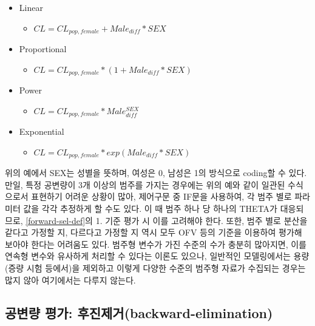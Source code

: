 \documentclass[
  11pt,
  krantz2, a4paper, twoside]{krantz}
\providecommand{\tightlist}{%
  \setlength{\itemsep}{0pt}\setlength{\parskip}{0pt}}
\theoremstyle{definition}
\theoremstyle{definition}
\theoremstyle{definition}
\theoremstyle{remark}
\begin{document}
\begin{itemize}
\tightlist
\item
  Linear

  \begin{itemize}
  \tightlist
  \item
    \(CL = CL_{pop,female} + Male_{diff}*SEX\)
  \end{itemize}
\item
  Proportional

  \begin{itemize}
  \tightlist
  \item
    \(CL = CL_{pop,female} * (1 + Male_{diff}*SEX)\)
  \end{itemize}
\item
  Power

  \begin{itemize}
  \tightlist
  \item
    \(CL = CL_{pop,female} * Male_{diff}^{SEX}\)
  \end{itemize}
\item
  Exponential

  \begin{itemize}
  \tightlist
  \item
    \(CL = CL_{pop,female} * exp(Male_{diff}*SEX)\)
  \end{itemize}
\end{itemize}

위의 예에서 SEX는 성별을 뜻하며, 여성은 0, 남성은 1의 방식으로 coding할 수 있다. 만일, 특정 공변량이 3개 이상의 범주를 가지는 경우에는 위의 예와 같이 일관된 수식으로서 표현하기 어려운 상황이 많아, 제어구문 중 IF문을 사용하여, 각 범주 별로 파라미터 값을 각각 추정하게 할 수도 있다. 이 때 범주 하나 당 하나의 THETA가 대응되므로, \ref{forward-sel-def}의 1. 기준 평가 시 이를 고려해야 한다. 또한, 범주 별로 분산을 같다고 가정할 지, 다르다고 가정할 지 역시 모두 OFV 등의 기준을 이용하여 평가해 보아야 한다는 어려움도 있다. 범주형 변수가 가진 수준의 수가 충분히 많아지면, 이를 연속형 변수와 유사하게 처리할 수 있다는 이론도 있으나, 일반적인 모델링에서는 용량(증량 시험 등에서)을 제외하고 이렇게 다양한 수준의 범주형 자료가 수집되는 경우는 많지 않아 여기에서는 다루지 않는다.

\hypertarget{uxacf5uxbcc0uxb7c9-uxd3c9uxac00-uxd6c4uxc9c4uxc81cuxac70backward-elimination}{%
\subsection{공변량 평가: 후진제거(backward-elimination)}\label{uxacf5uxbcc0uxb7c9-uxd3c9uxac00-uxd6c4uxc9c4uxc81cuxac70backward-elimination}}
\end{document}
